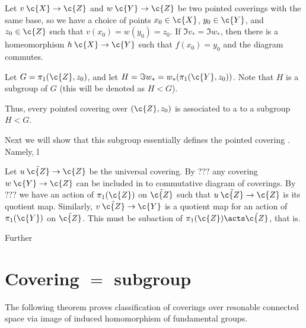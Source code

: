 \begin{figure}
\vskip-6mm
\centering
{}
\end{figure}

Let $v\:\c{X}\to \c{Z}$ and $w\:\c{Y}\to \c{Z}$ be two pointed coverings with the same base, so we have a choice of points
$x_0\in \c{X}$, $y_0\in \c{Y}$, and $z_0\in \c{Z}$ such that $v(x_0)=w(y_0)=z_0$.
If $\Im v_*=\Im w_*$, then there is a homeomorphism $h\:\c{X}\to\c{Y}$ such that $f(x_0)=y_0$ and the diagram commutes.

Let $G=\pi_1(\c{Z},z_0)$, and let $H=\Im w_*=w_*(\pi_1(\c{Y},z_0))$.
Note that $H$ is a subgroup of $G$ (this will be denoted as $H<G$).

Thus, every pointed covering over $(\c{Z},z_0)$ is associated to a to a subgroup $H<G$.

Next we will show that this subgroup essentially defines the pointed covering .
Namely, l

Let $u\:\tilde{\c{Z}}\to\c{Z}$ be the universal covering.
By ??? any covering $w\:\c{Y}\to\c{Z}$ can be included in to commutative diagram of coverings.
By ??? we have an action of $\pi_1(\c{Z})$ on $\tilde{\c{Z}}$ such that
$u\:\tilde{\c{Z}}\to\c{Z}$ is its quotient map.
Similarly,
$v\:\tilde{\c{Z}}\to \c{Y}$ is a quotient map for an action of $\pi_1(\c{Y})$ on $\tilde{\c{Z}}$.
This must be subaction of $\pi_1(\c{Z})\acts \tilde{\c{Z}}$, that is.

Further

\section[Covering = subgroup]{Covering $\bm{=}$ subgroup}

The following theorem proves classification of coverings over resonable connected space via image of induced homomorphism of fundamental groups.

\begin{figure}
\vskip-8mm
\centering
{}
\end{figure}

